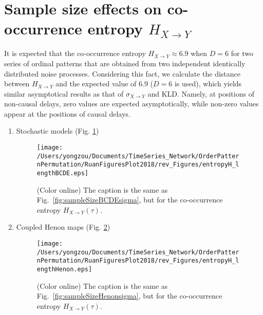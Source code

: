 \documentclass[aps,pre,superscriptaddress,floats,11pt]{revtex4}
\begin{document}
\section{Sample size effects on co-occurrence entropy $H_{X\to Y}$}
It is expected that the co-occurrence entropy $H_{X \to Y} \approx 6.9$ when $D = 6$ for two series of ordinal patterns that are obtained from two independent identically distributed noise processes. Considering this fact, we calculate the distance between $H_{X \to Y}$ and the expected value of 6.9 ($D = 6$ is used), which yields similar asymptotical results as that of $\sigma_{X\to Y}$ and KLD. Namely, at positions of non-causal delays, zero values are expected asymptotically, while non-zero values appear at the positions of causal delays. 
\begin{enumerate}
\item Stochastic models (Fig. \ref{fig:sampleSizeBCDEentropy})
\begin{figure}[htb]
	\centering
	\texttt{[image: /Users/yongzou/Documents/TimeSeries\_Network/OrderPatternPermutation/RuanFiguresPlot2018/rev\_Figures/entropyH\_lengthBCDE.eps]}
\caption{(Color online) The caption is the same as Fig.~\ref{fig:sampleSizeBCDEsigma}, but for the co-occurrence entropy $H_{X\to Y}(\tau)$. \label{fig:sampleSizeBCDEentropy}}
\end{figure}

\item Coupled Henon maps (Fig. \ref{fig:sampleSizeHenonentropy})
\begin{figure}[htb]
	\centering
	\texttt{[image: /Users/yongzou/Documents/TimeSeries\_Network/OrderPatternPermutation/RuanFiguresPlot2018/rev\_Figures/entropyH\_lengthHenon.eps]}
\caption{(Color online) The caption is the same as Fig.~\ref{fig:sampleSizeHenonsigma}, but for the co-occurrence entropy $H_{X\to Y}(\tau)$. \label{fig:sampleSizeHenonentropy}}
\end{figure}

\end{enumerate}
\end{document}
